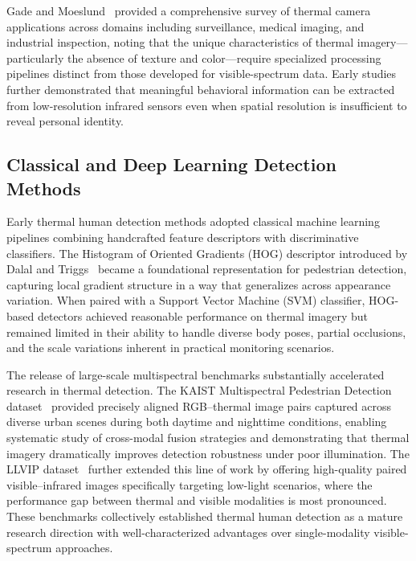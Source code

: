 Gade and Moeslund~\cite{gade2014thermal} provided a comprehensive survey of thermal camera applications across domains including surveillance, medical imaging, and industrial inspection, noting that the unique characteristics of thermal imagery---particularly the absence of texture and color---require specialized processing pipelines distinct from those developed for visible-spectrum data. Early studies further demonstrated that meaningful behavioral information can be extracted from low-resolution infrared sensors even when spatial resolution is insufficient to reveal personal identity.

\subsection*{Classical and Deep Learning Detection Methods}

Early thermal human detection methods adopted classical machine learning pipelines combining handcrafted feature descriptors with discriminative classifiers. The Histogram of Oriented Gradients (HOG) descriptor introduced by Dalal and Triggs~\cite{dalal2005hog} became a foundational representation for pedestrian detection, capturing local gradient structure in a way that generalizes across appearance variation. When paired with a Support Vector Machine (SVM) classifier, HOG-based detectors achieved reasonable performance on thermal imagery but remained limited in their ability to handle diverse body poses, partial occlusions, and the scale variations inherent in practical monitoring scenarios.

The release of large-scale multispectral benchmarks substantially accelerated research in thermal detection. The KAIST Multispectral Pedestrian Detection dataset~\cite{hwang2015kaist} provided precisely aligned RGB--thermal image pairs captured across diverse urban scenes during both daytime and nighttime conditions, enabling systematic study of cross-modal fusion strategies and demonstrating that thermal imagery dramatically improves detection robustness under poor illumination. The LLVIP dataset~\cite{jia2021llvip} further extended this line of work by offering high-quality paired visible--infrared images specifically targeting low-light scenarios, where the performance gap between thermal and visible modalities is most pronounced. These benchmarks collectively established thermal human detection as a mature research direction with well-characterized advantages over single-modality visible-spectrum approaches.

